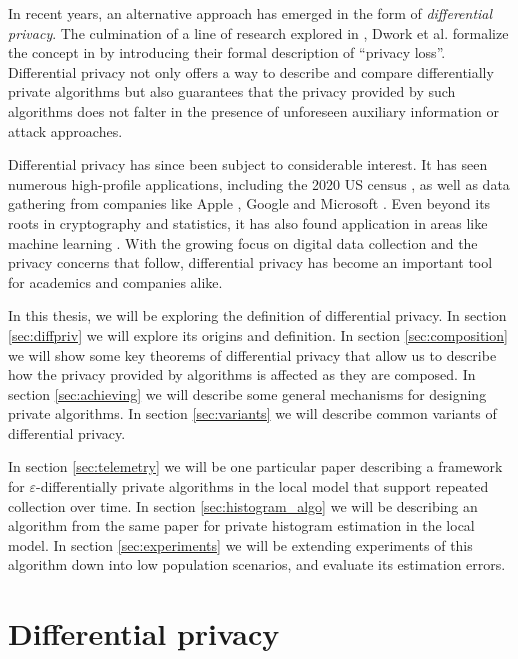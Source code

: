 \documentclass[12pt]{article}
\renewcommand{\epsilon}{\varepsilon}
\begin{document}
In recent years, an alternative approach has emerged in the form of \emph{differential privacy}. The culmination of a line of research explored in \cite{precursor_2003,precursor_2004,precusor_2005}, Dwork et al. formalize the concept in \cite{dworketal2006} by introducing their formal description of ``privacy loss''. Differential privacy not only offers a way to describe and compare differentially private algorithms but also guarantees that the privacy provided by such algorithms does not falter in the presence of unforeseen auxiliary information or attack approaches.

Differential privacy has since been subject to considerable interest. It has seen numerous high-profile applications, including the 2020 US census \cite{us_census}, as well as data gathering from companies like Apple \cite{apple_differential,apple_differential_loss}, Google \cite{google_rappor,google_prochlo} and Microsoft \cite{dworketal2006,microsoft_telemetry}. Even beyond its roots in cryptography and statistics, it has also found application in areas like machine learning \cite{ml_abadi,ml_shokri,ml_papernot}. With the growing focus on digital data collection and the privacy concerns that follow, differential privacy has become an important tool for academics and companies alike.

\bigskip

In this thesis, we will be exploring the definition of differential privacy. In section \ref{sec:diffpriv} we will explore its origins and definition. In section \ref{sec:composition} we will show some key theorems of differential privacy that allow us to describe how the privacy provided by algorithms is affected as they are composed. In section \ref{sec:achieving} we will describe some general mechanisms for designing private algorithms. In section \ref{sec:variants} we will describe common variants of differential privacy.

In section \ref{sec:telemetry} we will be one particular paper \cite{microsoft_telemetry} describing a framework for $\epsilon$-differentially private algorithms in the local model that support repeated collection over time. In section \ref{sec:histogram_algo} we will be describing an algorithm from the same paper for private histogram estimation in the local model. In section \ref{sec:experiments} we will be extending experiments of this algorithm down into low population scenarios, and evaluate its estimation errors.

\section{Differential privacy \label{sec:diffpriv}}
\end{document}
